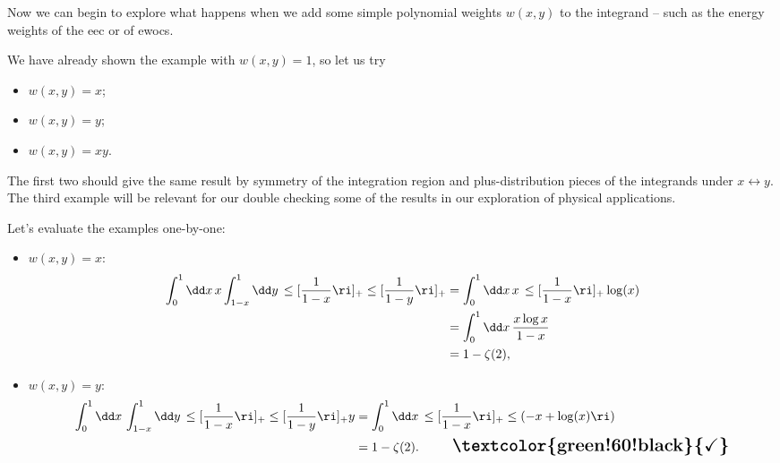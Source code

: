 Now we can begin to explore what happens when we add some simple polynomial weights \(w(x,y)\) to the integrand -- such as the energy weights of the \gls{eec} or of \glspl{ewoc}.

\begin{example}
We have already shown the example with \(w(x,y) = 1\), so let us try
\begin{itemize}
    \item
        \(w(x,y) = x\);
    \item
        \(w(x,y) = y\);
    \item
        \(w(x,y) = x y\).
\end{itemize}

The first two should give the same result by symmetry of the integration region and plus-distribution pieces of the integrands under \(x \leftrightarrow y\).
%
The third example will be relevant for our double checking some of the results in our exploration of physical applications.

Let's evaluate the examples one-by-one:
\begin{itemize}
    \item
        \(w(x,y) = x\):
        \begin{align}
            \int_{0}^{1} \dd x\,
            x
            \int_{1-x}^{1} \dd y\,
            \le[\frac{1}{1-x}\ri]_+
            \le[\frac{1}{1-y}\ri]_+
            &=
            \int_{0}^{1} \dd x\,x\,
            \le[\frac{1}{1-x}\ri]_+
            \log(x)
            \\
            &=
            \int_{0}^{1} \dd x\,
            \frac{x \log x}{1-x}
            \notag
            \\
            &= 1 - \zeta(2)
            \notag
            ,
        \end{align}

    \item
        \(w(x,y) = y\):
        \begin{align}
            \int_{0}^{1} \dd x\,
            \int_{1-x}^{1} \dd y\,
            \le[\frac{1}{1-x}\ri]_+
            \le[\frac{1}{1-y}\ri]_+
            y
            &=
            \int_{0}^{1} \dd x\,
            \le[\frac{1}{1-x}\ri]_+
            \le(-x + \log(x)\ri)
            \\
            &=
            1 - \zeta(2)
            \notag
            .
            ~~~~~~~~
            {\Large \textbf{\textcolor{green!60!black}{\checkmark}}}
        \end{align}


\end{itemize}
\end{example}
